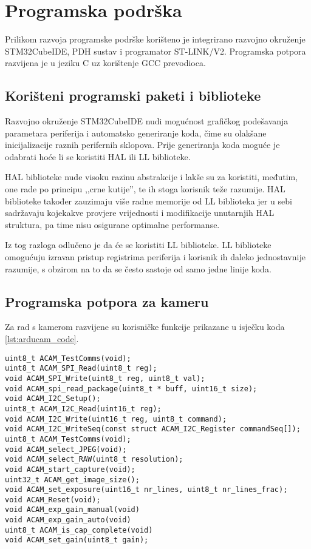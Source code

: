 \chapter{Programska podrška}

Prilikom razvoja programske podrške korišteno je integrirano razvojno okruženje \\ STM32CubeIDE, PDH sustav i programator ST-LINK/V2. Programska potpora razvijena je u jeziku C uz korištenje GCC prevodioca.

\section{Korišteni programski paketi i biblioteke}

Razvojno okruženje STM32CubeIDE nudi mogućnost grafičkog podešavanja parametara periferija i automatsko generiranje koda, čime su olakšane inicijalizacije raznih perifernih sklopova. Prije generiranja koda moguće je odabrati hoće li se koristiti HAL  ili LL  biblioteke.

HAL biblioteke nude visoku razinu abstrakcije i lakše su za koristiti, međutim, one rade po principu ,,crne kutije'', te ih stoga korisnik teže razumije. HAL biblioteke također zauzimaju više radne memorije od LL biblioteka jer u sebi sadržavaju kojekakve provjere vrijednosti i modifikacije unutarnjih HAL struktura, pa time nisu osigurane optimalne performanse.

Iz tog razloga odlučeno je da će se koristiti LL biblioteke. LL biblioteke omogućuju izravan pristup registrima periferija i korisnik ih daleko jednostavnije razumije, s obzirom na to da se često sastoje od samo jedne linije koda.

\section{Programska potpora za kameru}

Za rad s kamerom razvijene su korisničke funkcije prikazane u isječku koda \ref{lst:arducam_code}.

\begin{lstlisting}[caption=Korisničke funkcije za Arducam 5MP Mini Plus, label={lst:arducam_code}]
uint8_t ACAM_TestComms(void);
uint8_t ACAM_SPI_Read(uint8_t reg);
void ACAM_SPI_Write(uint8_t reg, uint8_t val);
void ACAM_spi_read_package(uint8_t * buff, uint16_t size);
void ACAM_I2C_Setup();
uint8_t ACAM_I2C_Read(uint16_t reg);
void ACAM_I2C_Write(uint16_t reg, uint8_t command);
void ACAM_I2C_WriteSeq(const struct ACAM_I2C_Register commandSeq[]);
uint8_t ACAM_TestComms(void);
void ACAM_select_JPEG(void);
void ACAM_select_RAW(uint8_t resolution);
void ACAM_start_capture(void);
uint32_t ACAM_get_image_size();
void ACAM_set_exposure(uint16_t nr_lines, uint8_t nr_lines_frac);
void ACAM_Reset(void);
void ACAM_exp_gain_manual(void)
void ACAM_exp_gain_auto(void)
uint8_t ACAM_is_cap_complete(void)
void ACAM_set_gain(uint8_t gain);
\end{lstlisting}

